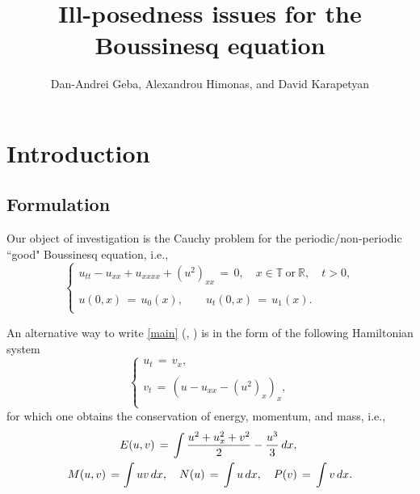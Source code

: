 \documentclass{amsart}
\begin{document}
\title{Ill-posedness issues for the Boussinesq equation}

\author{Dan-Andrei Geba, Alexandrou Himonas, and David Karapetyan}

\address{Department of Mathematics, University of Rochester, Rochester, NY 14627}
\address{Department of Mathematics, University of Notre Dame, Notre Dame, IN 46556}
\address{Department of Mathematics, University of Notre Dame, Notre Dame, IN 46556}
\date{}



\maketitle

\section{Introduction}

\subsection{Formulation} Our object of investigation is the Cauchy problem for the periodic/non-periodic ``good" Boussinesq equation, i.e.,
\begin{equation}
\left\{
\begin{array}{l}
u_{tt}-u_{xx}+u_{xxxx}+(u^2)_{xx}\,=\,0, \quad x\in \mathbb{T}\ \text{or} \ \mathbb{R}, \quad t>0,\\
\\
u(0,x)\,=\,u_0(x),\qquad u_t(0,x)\,=\,u_1(x).\\
\end{array}\right.
\label{main}
\end{equation}

An alternative way to write \eqref{main} (\cite{L93}, \cite{FG96}) is in the form of the following Hamiltonian system
\begin{equation}
\left\{
\begin{array}{l}
u_{t}\,=\,v_{x},\\
\\
v_t\,=\, \left(u-u_{xx}-(u^2)_x\right)_x,\\
\end{array}\right.
\label{sys}
\end{equation}
for which one obtains the conservation of energy, momentum, and mass, i.e.,
\[
\aligned
&E(u,v)\,=\,\int \frac{u^2+u_x^2+v^2}{2} - \frac{u^3}{3}\,dx,\\
M(u,v)\,=&\,\int uv \,dx, \quad N(u)\,=\,\int u \,dx,\quad P(v)\,=\,\int v \,dx.
\endaligned
\]
\end{document}
